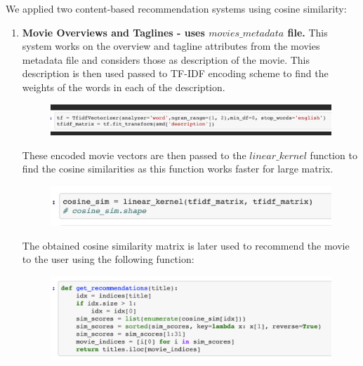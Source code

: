 \documentclass[10pt,conference]{IEEEtran}
\begin{document}
We applied two content-based recommendation systems using cosine similarity:
\begin{enumerate}
	\item
		\textbf{Movie Overviews and Taglines - uses ${movies\_metadata}$ file.}
		This system works on the overview and tagline attributes from the movies metadata file and considers those as description of the movie. This description is then used passed to TF-IDF encoding scheme to find the weights of the words in each of the description.
		\begin{figure}[h!]
			\centering
			\includegraphics[scale=.3]{tfidf.png}
			\label{fig:Tf-IDF}
		\end{figure}
		These encoded movie vectors are then passed to the ${linear\_kernel}$ function to find the cosine similarities as this function works faster for large matrix. 
		\begin{figure}[h!]
			\centering
			\includegraphics[scale=.5]{cosine_linear.png}
			\label{fig:Linear Kernel}
		\end{figure}
		The obtained cosine similarity matrix is later used to recommend the movie to the user using the following function: 
		\begin{figure}[h!]
			\centering
			\includegraphics[scale=.4]{recommendation.png}
			\label{fig:Get_recommendation}
		\end{figure}


\end{enumerate}
\end{document}
